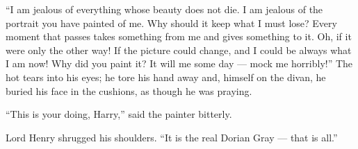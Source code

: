\documentclass{fiche}
\begin{document}
\begin{texte}
``I am jealous of everything whose beauty does not die. I am jealous of the portrait you have
painted of me. Why should it keep what I must lose? Every moment that passes takes something
from me and gives something to it. Oh, if it were only the other way! If the picture could
change, and I could be always what I am now! Why did you paint it? It will
 me some day --- mock me horribly!'' The hot tears
 into his eyes; he tore his hand away and,
 himself on the divan, he buried his face in the
cushions, as though he was praying.

``This is your doing, Harry,'' said the painter bitterly.

Lord Henry shrugged his shoulders. ``It is the real Dorian Gray --- that is all.''
\end{texte}

\end{document}
